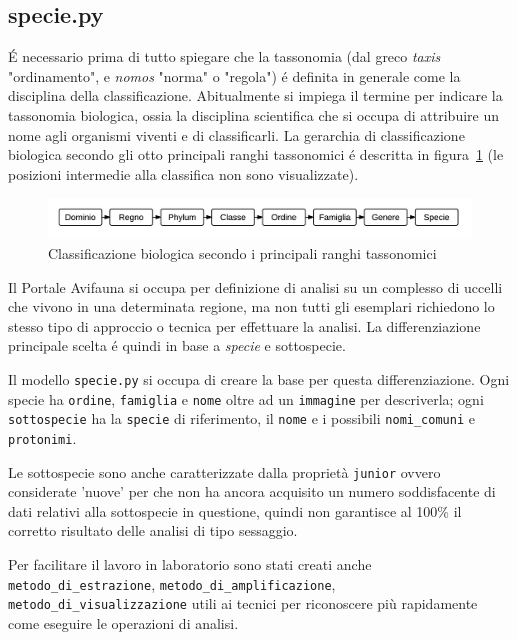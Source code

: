 \subsection*{specie.py}
\label{subs:specie}

É necessario prima di tutto spiegare che la tassonomia (dal greco \emph{taxis} "ordinamento", e \emph{nomos} "norma" o "regola") é definita in generale come la disciplina della classificazione. Abitualmente si impiega il termine per indicare la tassonomia biologica, ossia la disciplina scientifica che si occupa di attribuire un nome agli organismi viventi e di classificarli. La gerarchia di classificazione biologica secondo gli otto principali ranghi tassonomici é descritta in figura~\ref{fig:tassonomia} (le posizioni intermedie alla classifica non sono visualizzate).

\begin{figure}
 \includegraphics[width=1\textwidth]{images/tassonomia} 
 \caption{Classificazione biologica secondo i principali ranghi tassonomici}
 \label{fig:tassonomia}
\end{figure}

Il Portale Avifauna si occupa per definizione di analisi su un complesso di uccelli che vivono in una determinata regione, ma non tutti gli esemplari richiedono lo stesso tipo di approccio o tecnica per effettuare la analisi. La differenziazione principale scelta é quindi in base a \emph{specie} e sottospecie.

Il modello \texttt{specie.py} si occupa di creare la base per questa differenziazione. Ogni specie ha \texttt{ordine}, \texttt{famiglia} e \texttt{nome} oltre ad un \texttt{immagine} per descriverla; ogni \texttt{sottospecie} ha la \texttt{specie} di riferimento, il \texttt{nome} e i possibili \texttt{nomi\_comuni} e \texttt{protonimi}. 

Le sottospecie sono anche caratterizzate dalla proprietà \texttt{junior} ovvero considerate 'nuove' per {\fem} che non ha ancora acquisito un numero soddisfacente di dati relativi alla sottospecie in questione, quindi non garantisce al 100\% il corretto risultato delle analisi di tipo sessaggio. 

Per facilitare il lavoro in laboratorio sono stati creati anche \texttt{metodo\_di\_estrazione}, \texttt{metodo\_di\_amplificazione}, \texttt{metodo\_di\_visualizzazione} utili ai tecnici per riconoscere più rapidamente come eseguire le operazioni di analisi.

